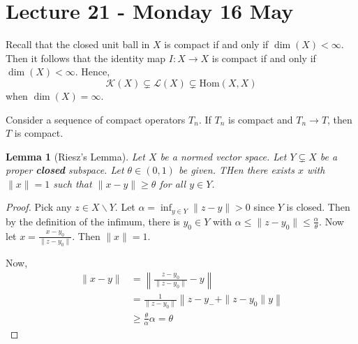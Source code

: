 \documentclass[10pt, oneside, reqno]{amsart}
\theoremstyle{plain}%
\newtheorem{lem}[thm]{Lemma}
\theoremstyle{definition}
\theoremstyle{remark}
\begin{document}
\section{Lecture 21 - Monday 16 May} %
\label{sec:lecture_21_monday_16_may}


Recall that the closed unit ball in $X$ is compact if and only if $\dim(X) < \infty$.  Then it follows that the identity map $I : X \rightarrow X$ is compact if and only if $\dim(X) < \infty$.  Hence, \[
	\mathcal K(X) \subsetneq \mathcal L(X) \subsetneq \text{Hom}(X, X) 
\] when $\dim(X) = \infty$.    

Consider a sequence of compact operators $T_n$.  If $T_n$ is compact and $T_n \rightarrow T$, then $T$ is compact.  

\begin{lem}[Riesz's Lemma]
	Let $X$ be a normed vector space.  Let $Y \subsetneq X$ be a proper \textbf{closed} subspace.  Let $\theta \in (0, 1)$ be given. THen there exists $x$ with $\| x \| = 1$ such that $\| x - y \| \geq \theta$ for all $y \in Y$.  
\end{lem}
\begin{proof}
	Pick any $z \in X \backslash Y$.  Let $\alpha = \inf_{y \in Y} \| z - y \| > 0$ since $Y$ is closed.  Then by the definition of the infimum, there is $y_0 \in Y$ with $\alpha \leq \| z - y_0 \| \leq \frac{\alpha}{\theta}$.  Now let $x = \frac{x - y_0}{\| z - y_0 \|}$.  Then $\| x \| = 1$.  
	
	Now, \begin{align*}
		\| x - y \| &= \left \| \frac{z - y_0}{\| z - y_0 \|} - y \right \| \\
					&= \frac{1}{\| z - y_0 \|} \left \| z - y_- + \| z - y_0 \| y \right \| \\
					&\geq \frac{\theta}{\alpha} \alpha = \theta
	\end{align*}
\end{proof}
\end{document}
